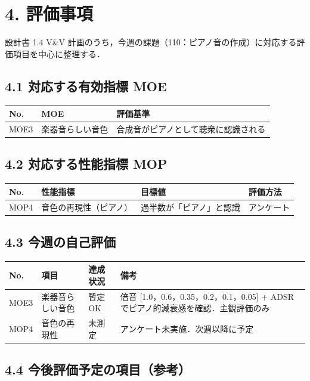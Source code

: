 \documentclass[a4paper,11pt]{ltjsarticle}
\providecommand{\％}{\%}
\begin{document}
\section{4. 評価事項}

設計書 1.4 V\&V 計画のうち，今週の課題（110：ピアノ音の作成）に対応する評価項目を中心に整理する．

\subsection*{4.1 対応する有効指標 MOE}

\begin{longtable}{|p{1.2cm}|p{4cm}|p{8cm}|}
\hline
\rowcolor[gray]{0.9}
No. & MOE & 評価基準 \\
\hline
MOE3 & 楽器音らしい音色 & 合成音がピアノとして聴衆に認識される \\
\hline
\end{longtable}

\subsection*{4.2 対応する性能指標 MOP}

\begin{longtable}{|p{1.2cm}|p{3.6cm}|p{4cm}|p{6cm}|}
\hline
\rowcolor[gray]{0.9}
No. & 性能指標 & 目標値 & 評価方法 \\
\hline
MOP4 & 音色の再現性（ピアノ） & 過半数が「ピアノ」と認識 & アンケート \\
\hline
\end{longtable}

\subsection*{4.3 今週の自己評価}

\begin{longtable}{|p{1.2cm}|p{3.5cm}|p{2cm}|p{8cm}|}
\hline
\rowcolor[gray]{0.9}
No. & 項目 & 達成状況 & 備考 \\
\hline
MOE3 & 楽器音らしい音色 & 暫定OK & 倍音 [1.0，0.6，0.35，0.2，0.1，0.05] + ADSR でピアノ的減衰感を確認．主観評価のみ \\
\hline
MOP4 & 音色の再現性 & 未測定 & アンケート未実施．次週以降に予定 \\
\hline
\end{longtable}

\subsection*{4.4 今後評価予定の項目（参考）}
\end{document}
